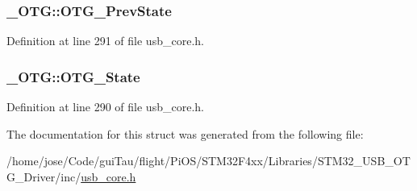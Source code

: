 \hypertarget{struct___o_t_g_a1be74b830692077a86f632d852a9d1d2}{
\subsubsection[{O\-T\-G\-\_\-\-Prev\-State}]{ \-\_\-\-O\-T\-G\-::\-O\-T\-G\-\_\-\-Prev\-State}}\label{struct___o_t_g_a1be74b830692077a86f632d852a9d1d2}


Definition at line 291 of file usb\-\_\-core.\-h.

\hypertarget{struct___o_t_g_ab2788b9a0ee109b43e4f8fcba8490293}{
\subsubsection[{O\-T\-G\-\_\-\-State}]{ \-\_\-\-O\-T\-G\-::\-O\-T\-G\-\_\-\-State}}\label{struct___o_t_g_ab2788b9a0ee109b43e4f8fcba8490293}


Definition at line 290 of file usb\-\_\-core.\-h.



The documentation for this struct was generated from the following file\-:\begin{DoxyCompactItemize}
\item 
/home/jose/\-Code/gui\-Tau/flight/\-Pi\-O\-S/\-S\-T\-M32\-F4xx/\-Libraries/\-S\-T\-M32\-\_\-\-U\-S\-B\-\_\-\-O\-T\-G\-\_\-\-Driver/inc/\hyperlink{_s_t_m32_f4xx_2_libraries_2_s_t_m32___u_s_b___o_t_g___driver_2inc_2usb__core_8h}{usb\-\_\-core.\-h}\end{DoxyCompactItemize}
